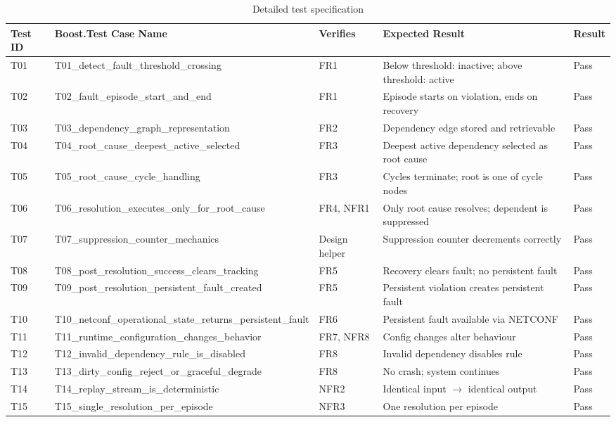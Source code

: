 \begin{table}[htbp]
\centering
\scriptsize
\caption{Detailed test specification}
\label{tab:test-specification}
\begin{tabular}{p{1.2cm} p{4.3cm} p{2.3cm} p{5.2cm} p{1.5cm}}
\toprule
Test ID & Boost.Test Case Name & Verifies & Expected Result & Result \\
\midrule
T01 & T01\_detect\_fault\_threshold\_crossing & FR1 & Below threshold: inactive; above threshold: active & Pass \\
T02 & T02\_fault\_episode\_start\_and\_end & FR1 & Episode starts on violation, ends on recovery & Pass \\
T03 & T03\_dependency\_graph\_representation & FR2 & Dependency edge stored and retrievable & Pass \\
T04 & T04\_root\_cause\_deepest\_active\_selected & FR3 & Deepest active dependency selected as root cause & Pass \\
T05 & T05\_root\_cause\_cycle\_handling & FR3 & Cycles terminate; root is one of cycle nodes & Pass \\
T06 & T06\_resolution\_executes\_only\_for\_root\_cause & FR4, NFR1 & Only root cause resolves; dependent is suppressed & Pass \\
T07 & T07\_suppression\_counter\_mechanics & Design helper & Suppression counter decrements correctly & Pass \\
T08 & T08\_post\_resolution\_success\_clears\_tracking & FR5 & Recovery clears fault; no persistent fault & Pass \\
T09 & T09\_post\_resolution\_persistent\_fault\_created & FR5 & Persistent violation creates persistent fault & Pass \\
T10 & T10\_netconf\_operational\_state\_returns\_persistent\_fault & FR6 & Persistent fault available via NETCONF & Pass \\
T11 & T11\_runtime\_configuration\_changes\_behavior & FR7, NFR8 & Config changes alter behaviour & Pass \\
T12 & T12\_invalid\_dependency\_rule\_is\_disabled & FR8 & Invalid dependency disables rule & Pass \\
T13 & T13\_dirty\_config\_reject\_or\_graceful\_degrade & FR8 & No crash; system continues & Pass \\
T14 & T14\_replay\_stream\_is\_deterministic & NFR2 & Identical input $\rightarrow$ identical output & Pass \\
T15 & T15\_single\_resolution\_per\_episode & NFR3 & One resolution per episode & Pass \\

\end{tabular}
\end{table}
